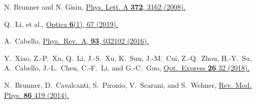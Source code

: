 \documentclass[pra,aps,notitlepage,superscriptaddress,showpacs,showkeys]{revtex4-1}
\theoremstyle{definition}
\theoremstyle{remark}
\begin{document}
\begin{thebibliography}{99}

 N. Brunner and N. Gisin,
 \href{http://dx.doi.org/10.1016/j.physleta.2008.01.052}{Phys. Lett. A \textbf{372}, 3162 (2008).}


 Q.~Li, et al.,
 \href{https://doi.org/10.1364/OPTICA.6.000067}{Optica \textbf{6}(1), 67 (2019).}

 A.~Cabello,
 \href{https://doi.org/10.1103/PhysRevA.93.032102}{Phys.~Rev.~A, \textbf{93}, 032102 (2016).}

 Y.~Xiao, Z.-P.~Xu, Q.~Li, J.-S.~Xu, K.~Sun, J.-M.~Cui, Z.-Q.~Zhou, H.-Y.~Su, A.~Cabello, J.-L.~Chen, C.-F.~Li, and G.-C.~Guo,
 \href{https://doi.org/10.1364/OE.26.000032}{Opt.~Express \textbf{26} 32 (2018).}

 N.~Brunner, D.~Cavalcanti, S.~Pironio, V.~Scarani, and S.~Wehner,
 \href{https://doi.org/10.1103/RevModPhys.86.419}{Rev. Mod. Phys. \textbf{86} 419 (2014).}

\end{thebibliography}
\end{document}
